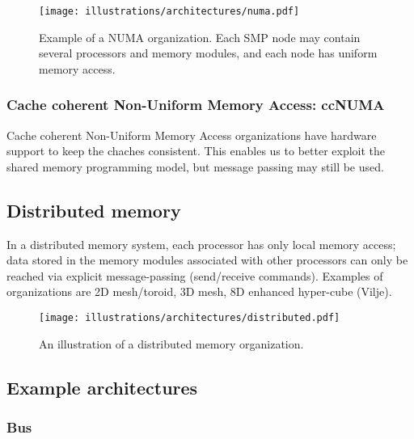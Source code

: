 \begin{figure}[H]
  \centering
  \texttt{[image: illustrations/architectures/numa.pdf]}
  \caption{Example of a NUMA organization. Each SMP node may contain several processors and memory modules, and each node has uniform memory access.}
  \label{fig:numa}
\end{figure}


\subsubsection{Cache coherent Non-Uniform Memory Access: ccNUMA} %
\label{ssub:cache_coherent_non_uniform_memory_access_ccnuma}
Cache coherent Non-Uniform Memory Access organizations have hardware support to keep the chaches consistent. This enables us to better exploit the shared memory programming model, but message passing may still be used.





\subsection{Distributed memory} %
\label{sub:distributed_memory}
In a distributed memory system, each processor has only local memory access; data stored in the memory modules associated with other processors can only be reached via explicit message-passing (send/receive commands). Examples of organizations are 2D mesh/toroid, 3D mesh, 8D enhanced hyper-cube (Vilje).

\begin{figure}[htbp]
  \centering
  \texttt{[image: illustrations/architectures/distributed.pdf]}
  \caption{An illustration of a distributed memory organization.}
  \label{fig:distributed}
\end{figure}



\subsection{Example architectures} %
\label{sub:example_architectures}

\subsubsection{Bus} %
\label{ssub:bus}

